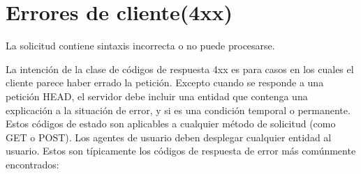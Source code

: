 \section{Errores de cliente(4xx)}
La solicitud contiene sintaxis incorrecta o no puede procesarse.
\bigskip
\par
La intención de la clase de códigos de respuesta 4xx es para casos en los cuales el cliente parece haber errado la petición. Excepto cuando se responde a una petición HEAD, el servidor debe incluir una entidad que contenga una explicación a la situación de error, y si es una condición temporal o permanente. Estos códigos de estado son aplicables a cualquier método de solicitud (como GET o POST). Los agentes de usuario deben desplegar cualquier entidad al usuario. Estos son típicamente los códigos de respuesta de error más comúnmente encontrados:
\bigskip
\par
